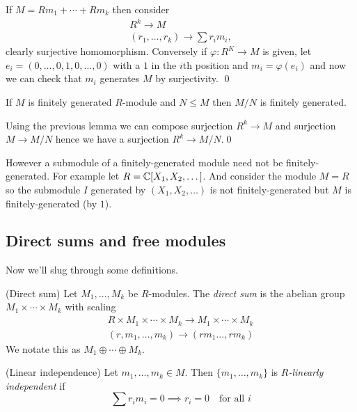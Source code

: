 \documentclass{article}
\begin{document}
\pf If $ M =Rm_1+\cdots+Rm_k $ then consider
\begin{align*}
  R^k\to M \\
  (r_1,\dots,r_k)\to \sum r_im_i,
\end{align*}
clearly surjective homomorphism.
Conversely if $ \varphi:R^K\to M $ is given, let $ e_i=(0,\dots, 0,1,0,\dots, 0) $ with a $ 1 $ in the $ i $th position and $ m_i =\varphi(e_i) $ and now we can check that $ m_i $ generates $ M $ by surjectivity. \qed
\begin{corollary}
  If $ M $ is finitely generated $ R $-module and $ N\le M $ then $ M/N $ is finitely generated.
\end{corollary}
\pf Using the previous lemma we can compose surjection $ R^k\to M $ and surjection $ M\to M/N $ hence we have a surjection $ R^k\to M/N $.\qed\par
However a submodule of a finitely-generated module need not be finitely-generated. For example let $ R=\mathbb{C}[X_1,X_2,\dots] $. And consider the module $ M=R $ so the submodule $ I $ generated by $ (X_1,X_2,\dots) $ is not finitely-generated but $ M $ is finitely-generated (by $ 1 $).
\subsection{Direct sums and free modules}
Now we'll slug through some definitions.
\begin{definition}
	(Direct sum) Let $ M_1,\dots, M_k $ be $ R $-modules. The \textit{direct sum} is the abelian group $ M_1\times\cdots\times M_k $ with scaling
	\begin{align*}
	  R\times M_1\times\cdots\times M_k\to M_1\times \cdots \times M_k \\
	  (r,m_1,\dots, m_k)\to (rm_1\dots, rm_k)
	\end{align*}
	We notate this as $ M_1\oplus \cdots \oplus M_k $.
\end{definition}
\begin{definition}
	(Linear independence) Let $ m_1,\dots, m_k\in M $. Then $ \{m_1,\dots, m_k\} $ is $ R $\textit{-linearly independent} if
	\[
		\sum r_im_i=0\implies r_i=0\quad\text{for all } i 
	\]
\end{definition}
\end{document}
